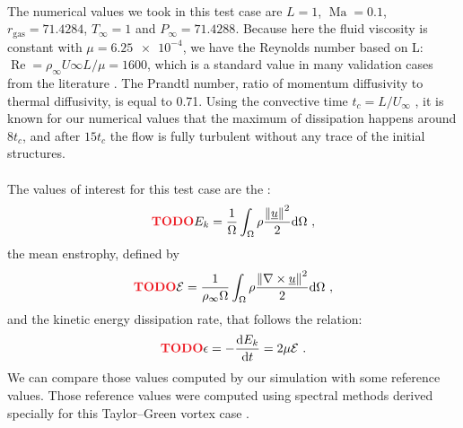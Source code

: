       \paragraph{}
      The numerical values we took in this test case are $L = 1$, $\operatorname{Ma} = 0.1$, $r_\textrm{gas} = 71.4284$, $T_\infty = 1$ and $P_\infty = 71.4288$.
      Because here the fluid viscosity is constant with $\mu = \num{6.25e-4}$, we have the Reynolds number based on L: $\operatorname{Re} = \rho_\infty U\infty L / \mu = 1600$, which is a standard value in many validation cases from the literature .
      The Prandtl number, ratio of momentum diffusivity to thermal diffusivity, is equal to 0.71.
      Using the convective time $t_c = L / U_\infty$ , it is known for our numerical values that the maximum of dissipation happens around $8 t_c$, and after $15 t_c$ the flow is fully turbulent without any trace of the initial structures.

      \paragraph{}
      The values of interest for this test case are the :
      \begin{equation} \PS{TODO}
        E_k = \frac{1}{\Omega} \int_\Omega \rho \frac{\norm{\vec{u}}^2}{2} \mathrm{d}\Omega \ ,
      \end{equation}
      the mean enstrophy, defined by
      \begin{equation} \PS{TODO}
        \mathcal{E} = \frac{1}{\rho_\infty \Omega} \int_\Omega \rho \frac{\norm{\nabla \times \vec{u}}^2}{2} \mathrm{d}\Omega \ ,
      \end{equation}
      and the kinetic energy dissipation rate, that follows the relation:
      \begin{equation} \PS{TODO}
        \epsilon = -\frac{\mathrm{d} E_k}{\mathrm{d} t} = 2 \mu \mathcal{E} \ .
      \end{equation}
      We can compare those values computed by our simulation with some reference values.
      Those reference values were computed using spectral methods derived specially for this Taylor--Green vortex case .

